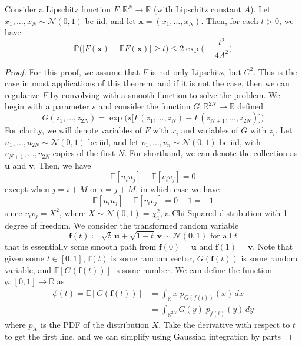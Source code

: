 \documentclass{article}
\begin{document}
  \begin{theorem}
  Consider a Lipschitz function $F: \mathbb{R}^N \longrightarrow \mathbb{R}$ (with Lipschitz constant $A$). Let $x_1, \ldots, x_N \sim \mathcal{N}(0, 1)$ be iid, and let $\mathbf{x} = (x_1, \ldots, x_N)$. Then, for each $t > 0$, we have 
  \[\mathbb{P} \big( | F(\mathbf{x}) - \mathbb{E} F(\mathbf{x}) | \geq t \big) \leq 2 \exp \bigg(- \frac{t^2}{4A^2} \bigg)\]
  \end{theorem}
  \begin{proof}
  For this proof, we assume that $F$ is not only Lipschitz, but $C^2$. This is the case in most applications of this theorem, and if it is not the case, then we can regularize $F$ by convolving with a smooth function to solve the problem. We begin with a parameter $s$ and consider the function $G: \mathbb{R}^{2N} \longrightarrow \mathbb{R}$ defined 
  \[G(z_1, \ldots, z_{2N}) = \exp \Big( s \big[ F ( z_1, \ldots, z_N) - F(z_{N+1}, \ldots, z_{2N}) \big] \Big)\]
  For clarity, we will denote variables of $F$ with $x_i$ and variables of $G$ with $z_i$. Let $u_1, \ldots, u_{2N} \sim \mathcal{N}(0, 1)$ be iid, and let $v_1, \ldots, v_n \sim \mathcal{N}(0, 1)$ be iid, with $v_{N+1}, \ldots, v_{2N}$ copies of the first $N$. For shorthand, we can denote the collection as $\mathbf{u}$ and $\mathbf{v}$. Then, we have 
  \[\mathbb{E} [u_i u_j] - \mathbb{E}[ v_i v_j] = 0\]
  except when $j = i + M$ or $i = j + M$, in which case we have 
  \[\mathbb{E} [u_i u_j] - \mathbb{E}[ v_i v_j] = 0 - 1 = -1\]
  since $v_i v_j = X^2$, where $X \sim \mathcal{N}(0, 1) = \chi^2_1$, a Chi-Squared distribution with 1 degree of freedom. We consider the transformed random variable
  \[\mathbf{f}(t) \coloneqq \sqrt{t} \, \mathbf{u} + \sqrt{1 - t} \, \mathbf{v} \sim \mathcal{N}(0, 1) \text{ for all } t\]
  that is essentially some smooth path from $\mathbf{f}(0) = \mathbf{u}$ and $\mathbf{f}(1) = \mathbf{v}$. Note that given some $t \in [0, 1]$, $\mathbf{f}(t)$ is some random vector, $G ( \mathbf{f}(t))$ is some random variable, and $\mathbb{E}[ G(\mathbf{f}(t))]$ is some number. We can define the function $\phi: [0, 1] \longrightarrow \mathbb{R}$ as 
  \begin{align*}
      \phi(t) = \mathbb{E} [G (\mathbf{f}(t))] & = \int_\mathbb{R} x \; p_{G(f(t))} (x) \,dx \\
      & = \int_{\mathbb{R}^{2N}} G(y) \; p_{f(t)} (y) \,dy 
  \end{align*}
  where $p_X$ is the PDF of the distribution $X$. Take the derivative with respect to $t$ to get the first line, and we can simplify using Gaussian integration by parts 

\end{proof}
\end{document}
